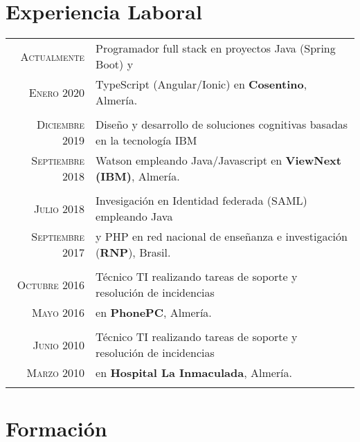 \documentclass[a4paper,10pt]{article}
\begin{document}
\section*{Experiencia Laboral}
\begin{tabular}{r|p{11cm}}

\textsc {Actualmente} & Programador full stack en proyectos Java (Spring Boot) y 
\\\textsc{Enero 2020} &  TypeScript (Angular/Ionic) en \textbf{Cosentino}, Almería. 
\normalsize \\\multicolumn{2}{c}{} \\

\textsc {Diciembre 2019} & Diseño y desarrollo de soluciones cognitivas basadas en la tecnología IBM 
\\\textsc{Septiembre 2018} &  Watson  empleando Java/Javascript en \textbf{ViewNext (IBM)}, Almería.  
\normalsize \\\multicolumn{2}{c}{} \\

\textsc {Julio 2018} & Invesigación en Identidad federada (SAML) empleando Java 
\\\textsc{Septiembre 2017} & y PHP en red nacional de enseñanza e investigación (\textbf{RNP}), Brasil.  \normalsize \\\multicolumn{2}{c}{} \\

\textsc{Octubre} 2016 & Técnico TI realizando tareas de soporte y resolución de incidencias\\\textsc{Mayo 2016} & en \textbf{PhonePC}, Almería. \normalsize \\\multicolumn{2}{c}{} \\


\textsc{Junio} 2010 & Técnico TI realizando tareas de soporte y resolución de incidencias\\\textsc{Marzo 2010} & en \textbf{Hospital La Inmaculada}, Almería. \normalsize \\\multicolumn{2}{c}{} \\


\end{tabular}

\section*{Formación}
\end{document}
